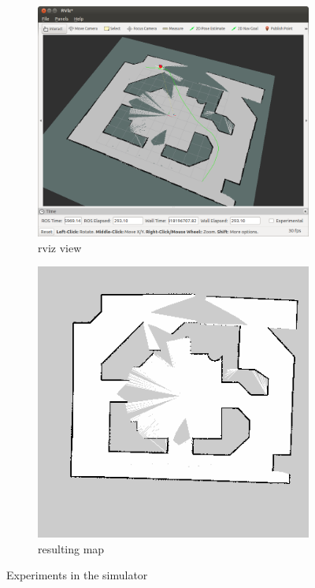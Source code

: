 \documentclass[a4paper]{article}
\begin{document}
\begin{figure}[h!]
  \centering
  \begin{subfigure}[b]{0.8\textwidth}
    \includegraphics[width=\textwidth,height=\textheight,keepaspectratio]{img/navigation_simulation_rviz.png}
    \caption{rviz view}
  \end{subfigure}
  \begin{subfigure}[b]{0.8\textwidth}
    \includegraphics[width=\textwidth,height=\textheight,keepaspectratio]{img/gmapping_simulation_map.png}
    \caption{resulting map}
  \end{subfigure}
  \caption{Experiments in the simulator}
  \label{fig:navigationresults}
\end{figure}
\end{document}
